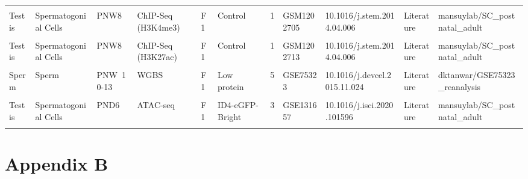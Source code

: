 \documentclass[12pt,twoside]{reedthesis}
\begin{document}
\begin{table}[H]
{\begin{tabular}[t]{llllllrllll}
\cellcolor{gray!6}{Testis} & \cellcolor{gray!6}{Spermatogonial Cells} & \cellcolor{gray!6}{PNW8} & \cellcolor{gray!6}{WGBS} & \cellcolor{gray!6}{F1} & \cellcolor{gray!6}{Control} & \cellcolor{gray!6}{7} & \cellcolor{gray!6}{GSE49623} & \cellcolor{gray!6}{10.1016/j.stem.2014.04.006} & \cellcolor{gray!6}{Literature} & \cellcolor{gray!6}{mansuylab/SC\_postnatal\_adult}\\
Testis & Spermatogonial Cells & PNW8 & ChIP-Seq (H3K4me3) & F1 & Control & 1 & GSM1202705 & 10.1016/j.stem.2014.04.006 & Literature & mansuylab/SC\_postnatal\_adult\\
\addlinespace
\cellcolor{gray!6}{Testis} & \cellcolor{gray!6}{Spermatogonial Cells} & \cellcolor{gray!6}{PNW8} & \cellcolor{gray!6}{ChIP-Seq (H3K27me3)} & \cellcolor{gray!6}{F1} & \cellcolor{gray!6}{Control} & \cellcolor{gray!6}{1} & \cellcolor{gray!6}{GSM1202708} & \cellcolor{gray!6}{10.1016/j.stem.2014.04.006} & \cellcolor{gray!6}{Literature} & \cellcolor{gray!6}{mansuylab/SC\_postnatal\_adult}\\
Testis & Spermatogonial Cells & PNW8 & ChIP-Seq (H3K27ac) & F1 & Control & 1 & GSM1202713 & 10.1016/j.stem.2014.04.006 & Literature & mansuylab/SC\_postnatal\_adult\\
\cellcolor{gray!6}{Sperm} & \cellcolor{gray!6}{Sperm} & \cellcolor{gray!6}{PNW 10-13} & \cellcolor{gray!6}{WGBS} & \cellcolor{gray!6}{F1} & \cellcolor{gray!6}{Control} & \cellcolor{gray!6}{6} & \cellcolor{gray!6}{GSE75323} & \cellcolor{gray!6}{10.1016/j.devcel.2015.11.024} & \cellcolor{gray!6}{Literature} & \cellcolor{gray!6}{dktanwar/GSE75323\_reanalysis}\\
Sperm & Sperm & PNW 10-13 & WGBS & F1 & Low protein & 5 & GSE75323 & 10.1016/j.devcel.2015.11.024 & Literature & dktanwar/GSE75323\_reanalysis\\
\cellcolor{gray!6}{Sperm} & \cellcolor{gray!6}{Sperm} & \cellcolor{gray!6}{PNW 10-13} & \cellcolor{gray!6}{WGBS} & \cellcolor{gray!6}{F1} & \cellcolor{gray!6}{High-fat} & \cellcolor{gray!6}{5} & \cellcolor{gray!6}{GSE75323} & \cellcolor{gray!6}{10.1016/j.devcel.2015.11.024} & \cellcolor{gray!6}{Literature} & \cellcolor{gray!6}{dktanwar/GSE75323\_reanalysis}\\
\addlinespace
Testis & Spermatogonial Cells & PND6 & ATAC-seq & F1 & ID4-eGFP-Bright & 3 & GSE131657 & 10.1016/j.isci.2020.101596 & Literature & mansuylab/SC\_postnatal\_adult\\
\cellcolor{gray!6}{Testis} & \cellcolor{gray!6}{Spermatogonial Cells} & \cellcolor{gray!6}{PND6} & \cellcolor{gray!6}{ATAC-seq} & \cellcolor{gray!6}{F1} & \cellcolor{gray!6}{ID4-eGFP-Dim} & \cellcolor{gray!6}{3} & \cellcolor{gray!6}{GSE131657} & \cellcolor{gray!6}{10.1016/j.isci.2020.101596} & \cellcolor{gray!6}{Literature} & \cellcolor{gray!6}{mansuylab/SC\_postnatal\_adult}\\
\bottomrule
\end{tabular}}
\end{table}
\hypertarget{ab}{%
\chapter*{Appendix B}\label{ab}}
\end{document}
